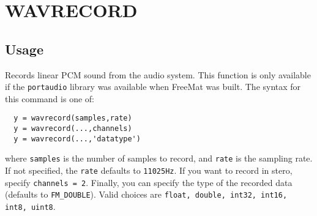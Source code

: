\section{WAVRECORD}

\subsection{Usage}

Records linear PCM sound from the audio system.  This function is
only available if the \verb|portaudio| library was available when FreeMat
was built.  The syntax for this command is one of:
\begin{verbatim}
  y = wavrecord(samples,rate)
  y = wavrecord(...,channels)
  y = wavrecord(...,'datatype')
\end{verbatim}
where \verb|samples| is the number of samples to record, and \verb|rate| is the
sampling rate.  If not specified, the \verb|rate| defaults to \verb|11025Hz|.
If you want to record in stero, specify \verb|channels = 2|.  Finally, you
can specify the type of the recorded data (defaults to \verb|FM_DOUBLE|).
Valid choices are \verb|float, double, int32, int16, int8, uint8|.
